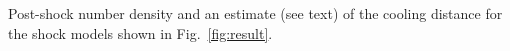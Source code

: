 \label{fig:rhocool}
Post-shock number density and an estimate (see text) of the cooling distance for the shock models shown in Fig.~\ref{fig:result}.